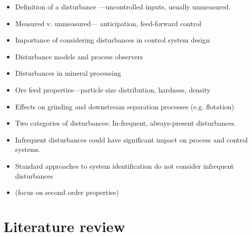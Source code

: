 \begin{itemize}
	\item Definition of a disturbance —uncontrolled inputs, usually unmeasured.
	\item Measured v. unmeasured— anticipation, feed-forward control
	\item Importance of considering disturbances in control system design
	\item Disturbance models and process observers
	\item Disturbances in mineral processing
	\item Ore feed properties—particle size distribution, hardness, density
	\item Effects on grinding and downstream separation processes (e.g. flotation)
	\item Two categories of disturbances: In-frequent, always-present disturbances.
	\item Infrequent disturbances could have significant impact on process and control systems.
	\item Standard approaches to system identification do not consider infrequent disturbances
	\item (focus on second order properties)
\end{itemize}


\section*{Literature review}


